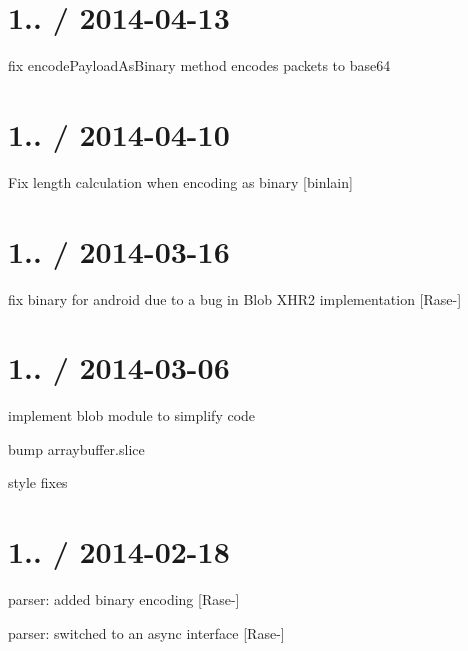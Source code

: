 \section*{1.. / 2014-\/04-\/13 }


\begin{DoxyItemize}
\item fix {\ttfamily encode\+Payload\+As\+Binary} method encodes packets to base64
\end{DoxyItemize}

\section*{1.. / 2014-\/04-\/10 }


\begin{DoxyItemize}
\item Fix length calculation when encoding as binary \mbox{[}binlain\mbox{]}
\end{DoxyItemize}

\section*{1.. / 2014-\/03-\/16 }


\begin{DoxyItemize}
\item fix binary for android due to a bug in Blob X\+H\+R2 implementation \mbox{[}Rase-\/\mbox{]}
\end{DoxyItemize}

\section*{1.. / 2014-\/03-\/06 }


\begin{DoxyItemize}
\item implement {\ttfamily blob} module to simplify code
\item bump {\ttfamily arraybuffer.\+slice}
\item style fixes
\end{DoxyItemize}

\section*{1.. / 2014-\/02-\/18 }


\begin{DoxyItemize}
\item parser\+: added binary encoding \mbox{[}Rase-\/\mbox{]}
\item parser\+: switched to an async interface \mbox{[}Rase-\/\mbox{]}
\end{DoxyItemize}

